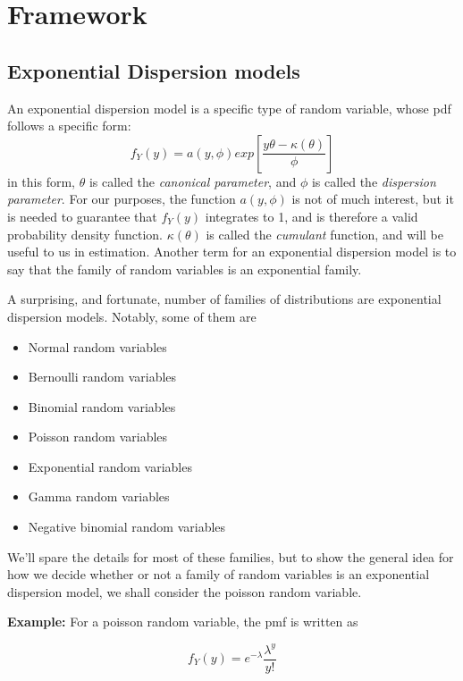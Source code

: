 \documentclass[
]{book}
\providecommand{\tightlist}{%
  \setlength{\itemsep}{0pt}\setlength{\parskip}{0pt}}
\begin{document}
\hypertarget{framework}{%
\section{Framework}\label{framework}}

\hypertarget{exponential-dispersion-models}{%
\subsection{Exponential Dispersion models}\label{exponential-dispersion-models}}

An exponential dispersion model is a specific type of random variable, whose pdf follows a specific form:
\[
f_{Y}(y) = a(y,\phi)exp\left[\frac{y\theta - \kappa(\theta)}{\phi}   \right]
\]
in this form, \(\theta\) is called the \emph{canonical parameter}, and \(\phi\) is called the \emph{dispersion parameter}. For our purposes, the function \(a(y,\phi)\) is not of much interest, but it is needed to guarantee that \(f_Y(y)\) integrates to 1, and is therefore a valid probability density function. \(\kappa(\theta)\) is called the \emph{cumulant} function, and will be useful to us in estimation. Another term for an exponential dispersion model is to say that the family of random variables is an exponential family.

A surprising, and fortunate, number of families of distributions are exponential dispersion models. Notably, some of them are

\begin{itemize}
\tightlist
\item
  Normal random variables
\item
  Bernoulli random variables
\item
  Binomial random variables
\item
  Poisson random variables
\item
  Exponential random variables
\item
  Gamma random variables
\item
  Negative binomial random variables
\end{itemize}

We'll spare the details for most of these families, but to show the general idea for how we decide whether or not a family of random variables is an exponential dispersion model, we shall consider the poisson random variable.

\textbf{Example:} For a poisson random variable, the pmf is written as

\[
f_Y(y) = e^{-\lambda}\frac{\lambda^y}{y!}
\]
\end{document}
